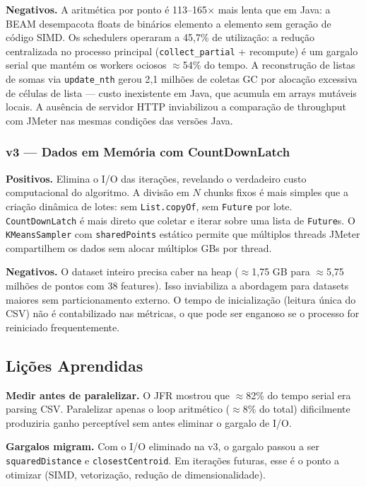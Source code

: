 \textbf{Negativos.}
A aritmética por ponto é 113--165$\times$ mais lenta que em Java: a BEAM
desempacota floats de binários elemento a elemento sem geração de código SIMD.
Os schedulers operaram a 45{,}7\% de utilização: a redução centralizada no processo
principal (\texttt{collect\_partial} + recompute) é um gargalo serial que mantém
os workers ociosos $\approx$54\% do tempo. A reconstrução de listas de somas via
\texttt{update\_nth} gerou 2{,}1 milhões de coletas GC por alocação excessiva de
células de lista --- custo inexistente em Java, que acumula em arrays mutáveis
locais. A ausência de servidor HTTP inviabilizou a comparação de throughput com
JMeter nas mesmas condições das versões Java.

\subsubsection*{v3 --- Dados em Memória com CountDownLatch}

\textbf{Positivos.}
Elimina o I/O das iterações, revelando o verdadeiro custo computacional do algoritmo.
A divisão em $N$ chunks fixos é mais simples que a criação dinâmica de lotes:
sem \texttt{List.copyOf}, sem \texttt{Future} por lote. \texttt{CountDownLatch}
é mais direto que coletar e iterar sobre uma lista de \texttt{Future}s. O
\texttt{KMeansSampler} com \texttt{sharedPoints} estático permite que múltiplos
threads JMeter compartilhem os dados sem alocar múltiplos GBs por thread.

\textbf{Negativos.}
O dataset inteiro precisa caber na heap ($\approx$1{,}75 GB para $\approx$5{,}75
milhões de pontos com 38 features). Isso inviabiliza a abordagem para datasets
maiores sem particionamento externo. O tempo de inicialização (leitura única do
CSV) não é contabilizado nas métricas, o que pode ser enganoso se o processo for
reiniciado frequentemente.

\subsection{Lições Aprendidas}

\textbf{Medir antes de paralelizar.}
O JFR mostrou que $\approx$82\% do tempo serial era parsing CSV. Paralelizar apenas o
loop aritmético ($\approx$8\% do total) dificilmente produziria ganho perceptível sem
antes eliminar o gargalo de I/O.

\textbf{Gargalos migram.}
Com o I/O eliminado na v3, o gargalo passou a ser \texttt{squaredDistance} e
\texttt{closestCentroid}. Em iterações futuras, esse é o ponto a otimizar
(SIMD, vetorização, redução de dimensionalidade).

